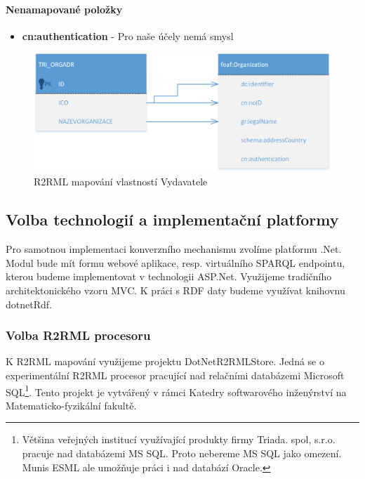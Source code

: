 \paragraph*{Nenamapované položky}
\begin{itemize}
\item \textbf{cn:authentication} - Pro naše účely nemá smysl
\end{itemize}

\begin{figure}[H]
\centerline{\includegraphics[width=\textwidth]{img/mapPublisher.eps}}
\caption{R2RML mapování vlastností Vydavatele}
\label{obr:mapPublisher}
\end{figure}

\subsection{Volba technologií a implementační platformy}

Pro samotnou implementaci konverzního mechanismu zvolíme platformu .Net. Modul bude mít formu webové aplikace, resp. virtuálního SPARQL endpointu, kterou budeme implementovat v technologii ASP.Net. Využijeme tradičního architektonického vzoru MVC. K práci s RDF daty budeme využívat knihovnu dotnetRdf.

\subsubsection{Volba R2RML procesoru}

K R2RML mapování využijeme projektu DotNetR2RMLStore\cite{r2rmlstore}\cite{r2rmlproj}. Jedná se o experimentální R2RML procesor pracující nad relačními databázemi Microsoft SQL\footnote{Většina veřejných institucí využívající produkty firmy Triada. spol, s.r.o. pracuje nad databázemi MS SQL. Proto nebereme MS SQL jako omezení. Munis ESML ale umožňuje práci i nad databází Oracle.}. Tento projekt je vytvářený v rámci Katedry softwarového inženýrství na Matematicko-fyzikální fakultě. 

